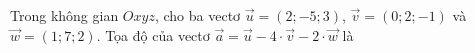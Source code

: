 \begin{ex}
Trong không gian $Oxyz$, cho ba vectơ $\vec u=(2;-5;3)$, $\vec v=(0;2;-1)$ và $\vec w=(1;7;2)$. Tọa độ của vectơ $\vec a=\vec u-4\cdot\vec v-2\cdot\vec w$ là
\end{ex}
